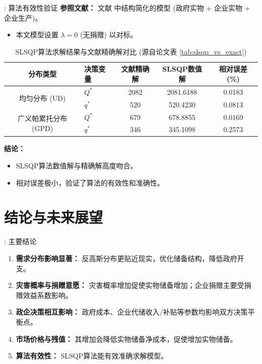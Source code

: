 \documentclass[9pt]{beamer}
\begin{document}
\begin{frame}{\insertsectionhead: 算法有效性验证}
    \textbf{参照文献：} 文献 \cite{LIY2023} 中结构简化的模型 (政府实物 + 企业实物 + 企业生产)。
    \begin{itemize}
        \item 本文模型设置 $\lambda=0$ (无捐赠) 以对标。
    \end{itemize}
    \begin{table}
    \centering
    \caption{SLSQP算法求解结果与文献精确解对比 (源自论文表 \ref{tab:slsqp_vs_exact})}
    \small
    \begin{tabular}{clccc}
    \toprule
    分布类型 & 决策变量 & 文献精确解 & SLSQP数值解 & 相对误差 (\%) \\
    \midrule
    \multirow{2}{*}{均匀分布 (UD)} & $Q^*$ & 2082 & 2081.6188 & 0.0183 \\
    & $q^*$ & 520  & 520.4230  & 0.0813 \\
    \midrule
    \multirow{2}{*}{广义帕累托分布 (GPD)} & $Q^*$ & 679 & 678.8855 & 0.0169 \\
    & $q^*$ & 346 & 345.1098 & 0.2573 \\
    \bottomrule
    \end{tabular}
    \end{table}
    \textbf{结论：}
    \begin{itemize}
        \item SLSQP算法数值解与精确解高度吻合。
        \item 相对误差极小，验证了算法的有效性和准确性。
    \end{itemize}
\end{frame}

\section{结论与未来展望}
\begin{frame}{\insertsectionhead: 主要结论}
    \begin{enumerate}
        \item \textbf{需求分布影响显著：} 反高斯分布更贴近现实，优化储备结构，降低政府开支。
        \item \textbf{灾害概率与捐赠意愿：} 灾害概率增加促使实物储备增加；企业捐赠主要受捐赠效益系数影响。
        \item \textbf{政企决策相互影响：} 政府成本、企业代储收入/补贴等参数均影响双方决策平衡点。
        \item \textbf{市场价格与残值：} 其增加会降低实物储备净成本，促使增加实物储备。
        \item \textbf{算法有效性：} SLSQP算法能有效准确求解模型。
    \end{enumerate}
\end{frame}
\end{document}
